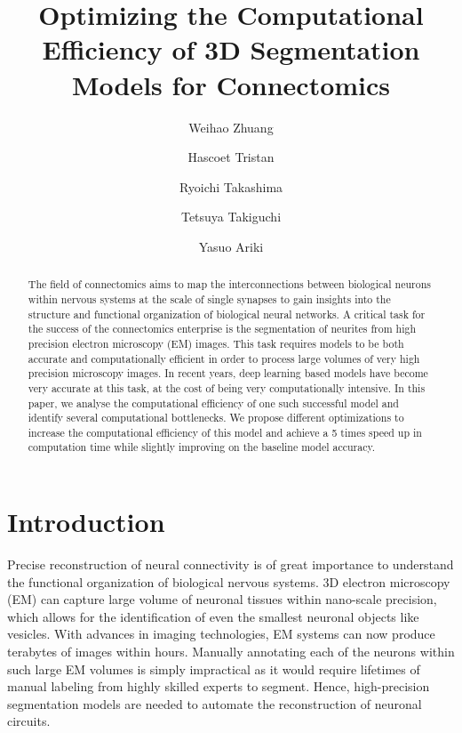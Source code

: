 \documentclass[runningheads]{llncs}
\begin{document}
\title{Optimizing the Computational Efficiency of 3D Segmentation Models for Connectomics}


\author{
Weihao Zhuang  %
\and
Hascoet Tristan %
\and
Ryoichi Takashima  %
\and
Tetsuya Takiguchi  %
\and
Yasuo Ariki %
}



\maketitle            

\begin{abstract}
The field of connectomics aims to map the interconnections between biological neurons within nervous systems at the scale of single synapses to gain insights into the structure and functional organization of biological neural networks. 
A critical task for the success of the connectomics enterprise is the segmentation of neurites from high precision electron microscopy (EM) images. 
This task requires models to be both accurate and computationally efficient in order to process large volumes of very high precision microscopy images. 
In recent years, deep learning based models have become very accurate at this task, at the cost of being very computationally intensive.
In this paper, we analyse the computational efficiency of one such successful model and identify several computational bottlenecks. 
We propose different optimizations to increase the computational efficiency of this model 
and achieve a 5 times speed up in computation time while slightly improving on the baseline model accuracy.

\end{abstract}

\section{Introduction}
Precise reconstruction of neural connectivity is of great importance to understand the functional organization of biological nervous systems. 
3D electron microscopy (EM) can capture large volume of neuronal tissues within nano-scale precision, which allows for the identification of even the smallest neuronal objects like vesicles. 
With advances in imaging technologies, EM systems can now produce terabytes of images within hours. 
Manually annotating each of the neurons within such large EM volumes is simply impractical as it would require lifetimes of manual labeling from highly skilled experts to segment. 
Hence, high-precision segmentation models are needed to automate the reconstruction of neuronal circuits. 
\end{document}
